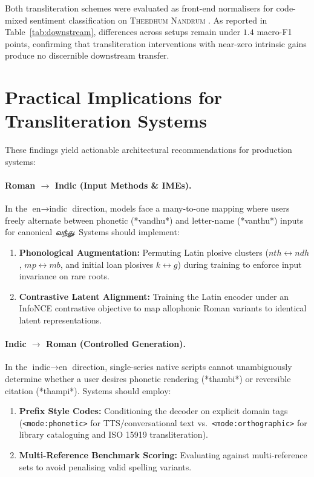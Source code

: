 \documentclass[11pt]{article}
\begin{document}


Both transliteration schemes were evaluated as front-end normalisers for code-mixed sentiment
classification on \textsc{Theedhum Nandrum} \cite{lakshmanan2020theedhum,chakravarthi-etal-2020-corpus}.
As reported in Table~\ref{tab:downstream}, differences across setups remain under $1.4$ macro-F1
points, confirming that transliteration interventions with near-zero intrinsic gains produce no
discernible downstream transfer.

\section{Practical Implications for Transliteration Systems}
\label{sec:practical}

These findings yield actionable architectural recommendations for production systems:

\paragraph{Roman $\rightarrow$ Indic (Input Methods \& IMEs).}
In the $\text{en}\rightarrow\text{indic}$ direction, models face a many-to-one mapping where users
freely alternate between phonetic (*vandhu*) and letter-name (*vanthu*) inputs for canonical
\textit{வந்து}. Systems should implement:
\begin{enumerate}
    \item \textbf{Phonological Augmentation:} Permuting Latin plosive clusters ($nth \leftrightarrow ndh$,
    $mp \leftrightarrow mb$, and initial loan plosives $k \leftrightarrow g$) during training to enforce
    input invariance on rare roots.
    \item \textbf{Contrastive Latent Alignment:} Training the Latin encoder under an InfoNCE
    contrastive objective to map allophonic Roman variants to identical latent representations.
\end{enumerate}

\paragraph{Indic $\rightarrow$ Roman (Controlled Generation).}
In the $\text{indic}\rightarrow\text{en}$ direction, single-series native scripts cannot
unambiguously determine whether a user desires phonetic rendering (*thambi*) or reversible
citation (*thampi*). Systems should employ:
\begin{enumerate}
    \item \textbf{Prefix Style Codes:} Conditioning the decoder on explicit domain tags
    (\texttt{<mode:phonetic>} for TTS/conversational text vs.\ \texttt{<mode:orthographic>} for
    library cataloguing and ISO 15919 transliteration).
    \item \textbf{Multi-Reference Benchmark Scoring:} Evaluating against multi-reference sets to
    avoid penalising valid spelling variants.
\end{enumerate}
\end{document}
